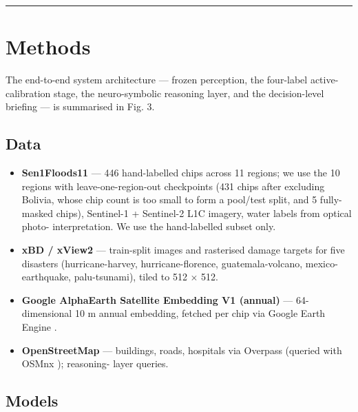 \documentclass[sn-nature,lineno]{sn-jnl}
\providecommand{\tightlist}{\setlength{\itemsep}{0pt}\setlength{\parskip}{0pt}}
\theoremstyle{thmstyleone}
\theoremstyle{thmstyletwo}
\theoremstyle{thmstylethree}
\begin{document}
\begin{center}\rule{0.5\linewidth}{0.5pt}\end{center}

\section{Methods}\label{methods}

The end-to-end system architecture --- frozen perception, the four-label
active-calibration stage, the neuro-symbolic reasoning layer, and the
decision-level briefing --- is summarised in Fig. 3.

\subsection{Data}\label{data}

\begin{itemize}
\tightlist
\item
  \textbf{Sen1Floods11} \cite{bonafilia2020sen1floods11} --- 446 hand-labelled chips across 11
  regions; we use the 10 regions with leave-one-region-out checkpoints
  (431 chips after excluding Bolivia, whose chip count is too small to
  form a pool/test split, and 5 fully-masked chips),
  Sentinel-1 + Sentinel-2 L1C imagery, water labels from optical photo-
  interpretation. We use the hand-labelled subset only.
\item
  \textbf{xBD / xView2} \cite{gupta2019xbd} --- train-split images and rasterised damage
  targets for five disasters (hurricane-harvey, hurricane-florence,
  guatemala-volcano, mexico-earthquake, palu-tsunami), tiled to 512 $\times$ 512.
\item
  \textbf{Google AlphaEarth Satellite Embedding V1 (annual)} \cite{brown2024alphaearth} --- 64-dimensional
  10 m annual embedding, fetched per chip via Google Earth Engine \cite{gee2024}.
\item
  \textbf{OpenStreetMap} \cite{openstreetmap2024} --- buildings, roads, hospitals via Overpass
  (queried with OSMnx \cite{boeing2017osmnx}); reasoning-
  layer queries.
\end{itemize}

\subsection{Models}\label{models}
\end{document}
